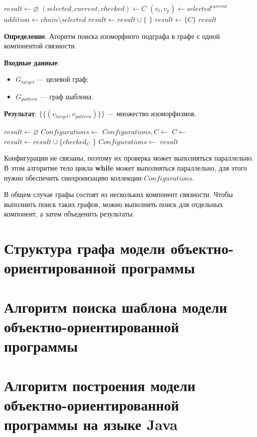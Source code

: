 \begin{algorithmic}
\State $result \gets \varnothing$
\State $(selected, current, checked) \gets C$
\State $(v_t, v_p) \gets selected^{current}$
    \State $addition \gets chain \setminus selected$
        \State $result \gets result \cup \{ $  $ \}$
    \EndIf
\EndFor
{}
    \State $result \gets \{ C \}$
\EndIf
\State \Return $result$
\EndFunction
\end{algorithmic}

\textbf{Определение}. Агоритм поиска изоморфного подграфа в графе с одной компонентой связности.

\textbf{Входные данные}:
\begin{itemize}
\item $G_{target}$ --- целевой граф;
\item $G_{pattern}$ --- граф шаблона.
\end{itemize}

\textbf{Результат}: $\{ \{ ( v_{target}, v_{pattern} ) \} \}$ --- множество
изоморфизмов.

\begin{algorithmic}
    \State $result \gets \varnothing$
    \State $Configurations \gets$ 
        \State $Configurations, C \gets$ 
        \State $C \gets$ 
                \State $result \gets result \cup \{ checked_C$ \}
            \EndIf
        \Else
            \State $Configurations \gets$ 
        \EndIf
    \EndWhile
    \State \Return $result$
\EndFunction
\end{algorithmic}

Конфигурации не связаны, поэтому их проверка может выполняться параллельно.
В этом алгоритме тело цикла \textbf{while} может выполняться параллельно,
для этого нужно обеспечить синхронизацию коллекции $Configurations$.

В общем случае графы состоят из нескольких компонент связности.
Чтобы выполнить поиск таких графов, можно выполнить поиск для отдельных компонент,
а затем объеденить результаты.

\section{Структура графа модели объектно-ориентированной программы}
\section{Алгоритм поиска шаблона модели объектно-ориентированной программы}
\section{Алгоритм построения модели объектно-ориентированной программы на языке Java}
